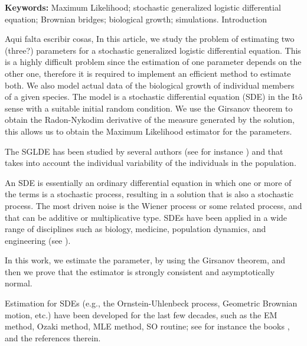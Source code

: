 \documentclass[12pt, reqno]{amsart}
\makeatletter
\def\section{\@startsection{section}{1}%
     \z@{.7\linespacing\@plus\linespacing}{.5\linespacing}%
     {\bfseries
     \centering
     }}
\newcommand{\1}{{\bf 1}}
\newcommand{\2}{{\bf 2}}
\theoremstyle{definition}
\theoremstyle{remark}
\numberwithin{equation}{section}
\makeatother
\begin{document}
\maketitle
\medskip\noindent
\medskip\noindent
{\bf Keywords:} Maximum Likelihood; stochastic generalized logistic differential equation; Brownian bridges; biological growth; simulations.
\allowdisplaybreaks
\section{Introduction}

{\color{red}  Aqui falta escribir cosas, 
}
In this article, we study the problem of estimating two {\color{red} 
(three?)}
parameters for a stochastic generalized logistic differential equation. This is 
a highly difficult problem since the estimation of one parameter depends on the 
other one, therefore it is required to implement an efficient method to 
estimate both.  We also model actual data of the biological growth of 
individual members of a given species. The model is a stochastic differential 
equation (SDE) in the It\^o sense with a suitable initial random condition. We  
use the Girsanov theorem to obtain the Radon-Nykodim derivative of the measure 
generated by the solution, this allows us to obtain the Maximum Likelihood 
estimator for the parameters. 

The SGLDE  has been studied by several authors (see for instance \cite{panik})  
and that takes into account the individual variability of the individuals in 
the population. 

	An SDE is essentially an ordinary differential equation in which one or more 
of the terms is a stochastic process, resulting in a solution that is also a 
stochastic process. The most driven noise is the Wiener process or some related 
process, and that can be additive or multiplicative type. SDEs have been 
applied in a wide range of disciplines such as biology, medicine, population 
dynamics, and engineering (see \cite{kl-pl}).  

	In this work, we estimate the parameter, by using the Girsanov theorem, and 
then we prove that the estimator is strongly consistent and asymptotically 
normal. 

	Estimation for SDEs (e.g., the Ornstein-Uhlenbeck process, Geometric Brownian 
motion, etc.) have been developed for the last few decades, such as the EM 
method, Ozaki method, MLE method, SO routine; see for instance 
the books \cite{panik}, \cite{iacus} and the references therein. 
\end{document}

